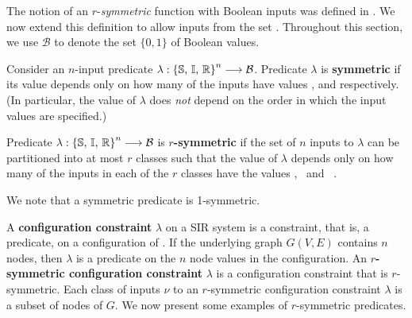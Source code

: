 The notion of an $r$-\emph{symmetric} function with Boolean
inputs was defined in \cite{BH+2007}.
We now extend this definition to allow inputs
from the set \bset.
Throughout this section, we use $\mathcal{B}$ to denote the
set $\{0,1\}$ of Boolean values.

\begin{definition} \label{def:r_symm}
Consider an $n$-input predicate $\lambda: \mbox{\{\mbox{$\mathbb{S}$}, \mbox{$\mathbb{I}$}, \mbox{$\mathbb{R}$}\}}^{n} \longrightarrow \mathcal{B}$.
Predicate $\lambda$ is \textbf{symmetric} if its value  
depends only on how many of the inputs have values \sstate,
\istate{} and \rstate{} respectively.
(In particular, the value of $\lambda$ does \emph{not}
depend on the order in which the input values are specified.)   

Predicate $\lambda: \mbox{\{\mbox{$\mathbb{S}$}, \mbox{$\mathbb{I}$}, \mbox{$\mathbb{R}$}\}}^{n} \longrightarrow \mathcal{B}$
is \textbf{$r$-symmetric} if the set of $n$ inputs to $\lambda$ can be 
partitioned into at most $r$ classes  
such that the value of $\lambda$ depends only on how many of the   
inputs in each of the $r$ classes have the values
\sstate, \istate{} ~and~ \rstate.
\end{definition}
We note that a symmetric predicate is 1-symmetric.

A \textbf{configuration constraint} $\lambda$ on a SIR system \cals{} is a
constraint, that is, a predicate, on a configuration of \cals{}.  
If the underlying graph $G(V,E)$ contains $n$ nodes,
then $\lambda$ is a predicate on the $n$ node values in the configuration. 
An \textbf{$r$-symmetric configuration constraint} 
$\lambda$ is a configuration constraint that is $r$-symmetric.
Each class of inputs
$\nu$ to an $r$-symmetric configuration constraint $\lambda$ is a
subset of nodes of $G$.  
We now present some examples of $r$-symmetric predicates.

